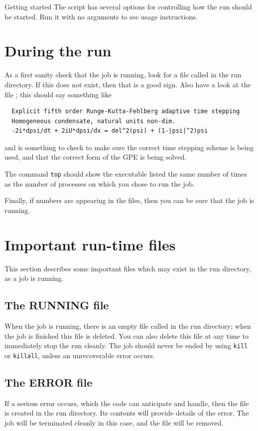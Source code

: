 \begin{chapter}{\label{cha:quickstart}Getting started}
  The  script has several options for controlling how the run
  should be started.  Run it with no arguments to see usage instructions.

  \section{During the run}
  As a first sanity check that the job is running, look for a file called
   in the run directory.  If this does not exist, then that is a
  good sign.  Also have a look at the file ; this should say
  something like
  \begin{Verbatim}
  Explicit fifth order Runge-Kutta-Fehlberg adaptive time stepping
  Homogeneous condensate, natural units non-dim.
  -2i*dpsi/dt + 2iU*dpsi/dx = del^2(psi) + (1-|psi|^2)psi
  \end{Verbatim}
  and is something to check to make sure the correct time stepping scheme is
  being used, and that the correct form of the GPE is being solved.

  The command \verb"top" should show the  executable listed the
  same number of times as the number of processes on which you chose to run the
  job.

  Finally, if numbers are appearing in the  files, then you can
  be sure that the job is running.

  \section{Important run-time files}
  This section describes some important files which may exist in the run
  directory, as a job is running.

  \subsection{The RUNNING file}
  When the job is running, there is an empty file called  in
  the run directory; when the job is finished this file is deleted.  You can
  also delete this file at any time to immediately stop the run cleanly.  The
  job should never be ended by using \verb"kill" or \verb"killall", unless an
  unrecoverable error occurs.

  \subsection{The ERROR file}
  If a serious error occurs, which the code can anticipate and handle, then the
   file is created in the run directory.  Its contents will
  provide details of the error.  The job will be terminated cleanly in this
  case, and the  file will be removed.


\end{chapter}

